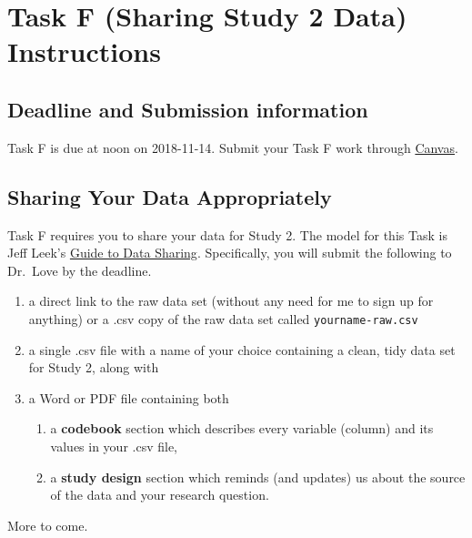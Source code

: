 \documentclass[]{book}
\providecommand{\tightlist}{%
  \setlength{\itemsep}{0pt}\setlength{\parskip}{0pt}}
\theoremstyle{definition}
\theoremstyle{definition}
\theoremstyle{definition}
\theoremstyle{remark}
\begin{document}
\hypertarget{taskF}{%
\chapter{Task F (Sharing Study 2 Data) Instructions}\label{taskF}}

\hypertarget{deadline-and-submission-information-5}{%
\section{Deadline and Submission
information}\label{deadline-and-submission-information-5}}

Task F is due at noon on 2018-11-14. Submit your Task F work through
\href{https://canvas.case.edu/}{Canvas}.

\hypertarget{sharing-your-data-appropriately}{%
\section{Sharing Your Data
Appropriately}\label{sharing-your-data-appropriately}}

Task F requires you to share your data for Study 2. The model for this
Task is Jeff Leek's \href{https://github.com/jtleek/datasharing}{Guide
to Data Sharing}. Specifically, you will submit the following to
Dr.~Love by the deadline.

\begin{enumerate}
\def\labelenumi{\arabic{enumi}.}
\tightlist
\item
  a direct link to the raw data set (without any need for me to sign up
  for anything) or a .csv copy of the raw data set called
  \texttt{yourname-raw.csv}
\item
  a single .csv file with a name of your choice containing a clean, tidy
  data set for Study 2, along with
\item
  a Word or PDF file containing both

  \begin{enumerate}
  \def\labelenumii{\alph{enumii}.}
  \tightlist
  \item
    a \textbf{codebook} section which describes every variable (column)
    and its values in your .csv file,
  \item
    a \textbf{study design} section which reminds (and updates) us about
    the source of the data and your research question.
  \end{enumerate}
\end{enumerate}

More to come.
\end{document}
